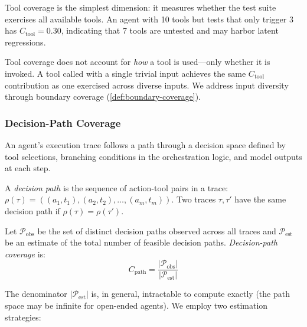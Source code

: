Tool coverage is the simplest dimension: it measures whether the test
suite exercises all available tools. An agent with 10 tools but tests
that only trigger 3 has $C_{\text{tool}} = 0.30$, indicating that 7
tools are untested and may harbor latent regressions.

\begin{remark}
Tool coverage does not account for \emph{how} a tool is used---only
whether it is invoked. A tool called with a single trivial input achieves
the same $C_{\text{tool}}$ contribution as one exercised across diverse
inputs. We address input diversity through boundary coverage
(\cref{def:boundary-coverage}).
\end{remark}

\subsubsection{Decision-Path Coverage}
\label{sec:coverage:path}

An agent's execution trace follows a path through a decision space
defined by tool selections, branching conditions in the orchestration
logic, and model outputs at each step.

\begin{definition}
\label{def:decision-path}
A \emph{decision path} is the sequence of action-tool pairs in a trace:
$\rho(\tau) = ((a_1, t_1), (a_2, t_2), \ldots, (a_m, t_m))$. Two
traces $\tau, \tau'$ have the same decision path if
$\rho(\tau) = \rho(\tau')$.
\end{definition}

\begin{definition}
\label{def:path-coverage}
Let $\mathcal{P}_{\text{obs}}$ be the set of distinct decision paths
observed across all traces and $\mathcal{P}_{\text{est}}$ be an estimate
of the total number of feasible decision paths. \emph{Decision-path
coverage} is:
\begin{equation}
\label{eq:path-coverage}
  C_{\text{path}} = \frac{|\mathcal{P}_{\text{obs}}|}{|\mathcal{P}_{\text{est}}|}
\end{equation}
\end{definition}

The denominator $|\mathcal{P}_{\text{est}}|$ is, in general,
intractable to compute exactly (the path space may be infinite for
open-ended agents). We employ two estimation strategies:

